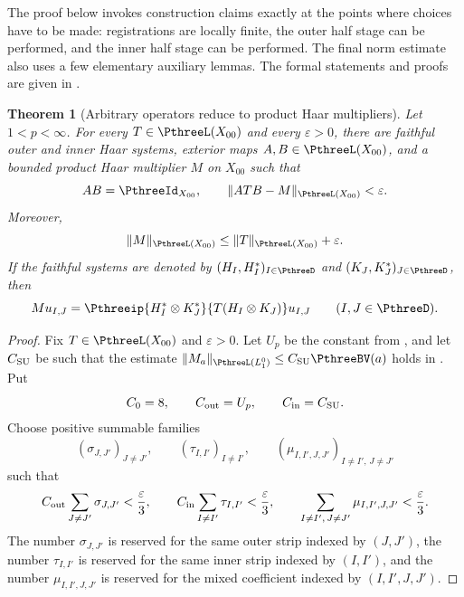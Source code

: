 \documentclass[11pt,reqno]{amsart}
\makeatletter
\theoremstyle{plain}
\newtheorem{theorem}{Theorem}[section]
\theoremstyle{definition}
\newcounter{problempaper}
\newenvironment{problempaperbody}{%
  \setcounter{subsection}{0}%
  \setcounter{subsubsection}{0}%
  \setcounter{paragraph}{0}%
  \renewcommand{\thesubsection}{\arabic{subsection}}%
  \renewcommand{\thesubsubsection}{\thesubsection.\arabic{subsubsection}}%
  \renewcommand{\theparagraph}{\thesubsubsection.\arabic{paragraph}}%
  \let\problem@outersection\section
  \let\problem@outersubsection\subsection
  \let\problem@outersubsubsection\subsubsection
  \let\problem@outerparagraph\paragraph
  \let\section\problem@papersection
  \let\subsection\problem@papersubsection
  \let\subsubsection\problem@papersubsubsection
}{%
  \let\section\problem@outersection
  \let\subsection\problem@outersubsection
  \let\subsubsection\problem@outersubsubsection
  \let\paragraph\problem@outerparagraph
}
\newcommand{\problem@target}[2]{%
  \hypertarget{problem-\theproblempaper-#1-#2}{}%
}
\newcommand{\problem@paperheading}[3]{%
  \par\bigskip
  \problem@target{#1}{#2}%
  \noindent{\large\bfseries #2.\quad #3\par}%
  \nobreak\smallskip
}
\newcommand{\problem@papersubheading}[3]{%
  \par\medskip
  \problem@target{#1}{#2}%
  \noindent{\normalsize\bfseries #2.\quad #3\par}%
  \nobreak\smallskip
}
\newcommand{\problem@papersubsubheading}[3]{%
  \par\smallskip
  \problem@target{#1}{#2}%
  \noindent{\normalsize\itshape #2.\quad #3.\ }%
}
\def\problem@papersection{%
  \@ifstar{\problem@papersectionstar}{\problem@papersectionnostar}%
}
\def\problem@papersectionstar#1{%
  \par\bigskip\noindent{\large\bfseries #1\par}\nobreak\smallskip
}
\def\problem@papersectionnostar#1{%
  \refstepcounter{subsection}%
  \setcounter{subsubsection}{0}%
  \setcounter{paragraph}{0}%
  \problem@paperheading{section}{\thesubsection}{#1}%
  \problem@writecontentsline{section}{\thesubsection}{#1}%
}
\def\problem@papersubsection{%
  \@ifstar{\problem@papersubsectionstar}{\problem@papersubsectionnostar}%
}
\def\problem@papersubsectionstar#1{%
  \par\medskip\noindent{\normalsize\bfseries #1\par}\nobreak\smallskip
}
\def\problem@papersubsectionnostar#1{%
  \refstepcounter{subsubsection}%
  \setcounter{paragraph}{0}%
  \problem@papersubheading{subsection}{\thesubsubsection}{#1}%
  \problem@writecontentsline{subsection}{\thesubsubsection}{#1}%
}
\def\problem@papersubsubsection{%
  \@ifstar{\problem@papersubsubsectionstar}{\problem@papersubsubsectionnostar}%
}
\def\problem@papersubsubsectionstar#1{%
  \par\smallskip\noindent{\normalsize\itshape #1.\ }%
}
\def\problem@papersubsubsectionnostar#1{%
  \refstepcounter{paragraph}%
  \problem@papersubsubheading{subsubsection}{\theparagraph}{#1}%
  \problem@writecontentsline{subsubsection}{\theparagraph}{#1}%
}
\newcommand{\problem@writecontentsline}[3]{%
  \begingroup
  \protected@write\@auxout{}{%
    \string\problemcontentsentry{\theproblempaper}{#1}{#2}{#3}{\thepage}%
  }%
  \endgroup
}
\newcommand{\problemcontentsentry}[5]{%
  \@ifundefined{problemcontents@#1}{%
    \expandafter\gdef\csname problemcontents@#1\endcsname{}%
  }{}%
  \expandafter\g@addto@macro\csname problemcontents@#1\endcsname{%
    \problemcontentsline{#1}{#2}{#3}{#4}{#5}%
  }%
}
\newcommand{\problemcontentslink}[4]{%
  \hyperlink{problem-#1-#2-#3}{#4}%
}
\newcommand{\problemcontentsline}[5]{%
  \ifstrequal{#2}{section}{%
    \par\noindent
    \problemcontentslink{#1}{#2}{#3}{\makebox[2.5em][l]{#3}#4}%
    \nobreak\dotfill
    \problemcontentslink{#1}{#2}{#3}{#5}\par
  }{%
    \ifstrequal{#2}{subsection}{%
      \par\noindent\hspace*{1.5em}%
      \problemcontentslink{#1}{#2}{#3}{\makebox[3.5em][l]{#3}#4}%
      \nobreak\dotfill
      \problemcontentslink{#1}{#2}{#3}{#5}\par
    }{%
      \par\noindent\hspace*{3em}%
      \problemcontentslink{#1}{#2}{#3}{\makebox[4.5em][l]{#3}#4}%
      \nobreak\dotfill
      \problemcontentslink{#1}{#2}{#3}{#5}\par
    }%
  }%
}
\makeatother
\begin{document}
\begin{problempaperbody}
The proof below invokes construction claims exactly at the points where choices have to be made: registrations are locally finite, the outer half stage can be performed, and the inner half stage can be performed. The final norm estimate also uses a few elementary auxiliary lemmas. The formal statements and proofs are given in .

\begin{theorem}[Arbitrary operators reduce to product Haar multipliers]
\label{p3:thm:reduction-to-multiplier}
Let $1<p<\infty$. For every $T\in\PthreeL(X_{00})$ and every $\varepsilon>0$, there are faithful outer and inner Haar systems, exterior maps $A,B\in\PthreeL(X_{00})$, and a bounded product Haar multiplier $M$ on $X_{00}$ such that
\begin{equation*}
        AB=\PthreeId_{X_{00}},\qquad \|ATB-M\|_{\PthreeL(X_{00})}<\varepsilon.
\end{equation*}
Moreover,
\begin{equation*}
        \|M\|_{\PthreeL(X_{00})}\leq \|T\|_{\PthreeL(X_{00})}+\varepsilon.
\end{equation*}
If the faithful systems are denoted by $(H_I,H_I^*)_{I\in\PthreeD}$ and $(K_J,K_J^*)_{J\in\PthreeD}$, then
\begin{equation*}
        Mu_{I,J}=\Pthreeip{H_I^*\otimes K_J^*}{T(H_I\otimes K_J)}u_{I,J}\qquad(I,J\in\PthreeD).
\end{equation*}
\end{theorem}

\begin{proof}
Fix $T\in\PthreeL(X_{00})$ and $\varepsilon>0$. Let $U_p$ be the constant from , and let $C_{\rm SU}$ be such that the estimate $\|M_a\|_{\PthreeL(L_1^0)}\leq C_{\rm SU}\PthreeBV(a)$ holds in . Put
\begin{equation*}
        C_0=8,\qquad C_{\rm out}=U_p,\qquad C_{\rm in}=C_{\rm SU}.
\end{equation*}
Choose positive summable families
\begin{equation*}
        (\sigma_{J,J'})_{J\ne J'},\qquad (\tau_{I,I'})_{I\ne I'},\qquad (\mu_{I,I',J,J'})_{I\ne I',\,J\ne J'}
\end{equation*}
such that
\begin{equation}
\label{p3:eq:multiplier-reduction-budgets}
        C_{\rm out}\sum_{J\ne J'}\sigma_{J,J'}<\frac{\varepsilon}{3},\qquad C_{\rm in}\sum_{I\ne I'}\tau_{I,I'}<\frac{\varepsilon}{3},\qquad \sum_{I\ne I',\,J\ne J'}\mu_{I,I',J,J'}<\frac{\varepsilon}{3}.
\end{equation}
The number $\sigma_{J,J'}$ is reserved for the same outer strip indexed by $(J,J')$, the number $\tau_{I,I'}$ is reserved for the same inner strip indexed by $(I,I')$, and the number $\mu_{I,I',J,J'}$ is reserved for the mixed coefficient indexed by $(I,I',J,J')$.


\end{proof}
\end{problempaperbody}
\end{document}
